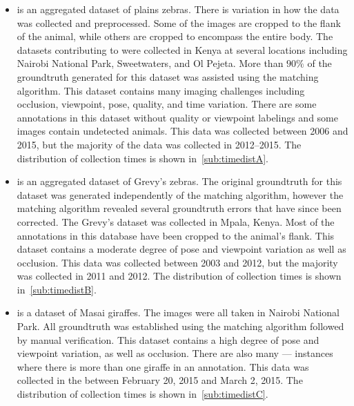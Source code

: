         \begin{itemize}
            \item \textbf{\pzmasterI{}} is an aggregated dataset of
              plains zebras.
            There is variation in how the data was collected and
              preprocessed.
            Some of the images are cropped to the flank of the animal,
              while others are cropped to encompass the entire body.
            The datasets contributing to \pzmasterI{} were collected in
              Kenya at several locations including Nairobi National Park,
              Sweetwaters, and Ol Pejeta.
            More than $90\percent$ of the groundtruth generated for
              this dataset was assisted using the matching algorithm.
            This dataset contains many imaging challenges including
              occlusion, viewpoint, pose, quality, and time variation.
            There are some annotations in this dataset without quality
              or viewpoint labelings and some images contain undetected
              animals.
            This data was collected between 2006 and 2015, but the
              majority of the data was collected in 2012--2015.
            The distribution of collection times is shown
              in~\cref{sub:timedistA}.

            \item \textbf{\gzall{}} is an aggregated dataset of Grevy's
              zebras.
            The original groundtruth for this dataset was generated
              independently of the matching algorithm, however the
              matching algorithm revealed several groundtruth errors that
              have since been corrected.
            The Grevy's dataset was collected in Mpala, Kenya.
            Most of the annotations in this database have been cropped
              to the animal's flank.
            This dataset contains a moderate degree of pose and
              viewpoint variation as well as occlusion.
            This data was collected between 2003 and 2012, but the
              majority was collected in 2011 and 2012.
            The distribution of collection times is shown
              in~\cref{sub:timedistB}.

            \item \textbf{\girmmasterI{}} is a dataset of Masai giraffes.
            The images were all taken in Nairobi National Park.
            All groundtruth was established using the matching
              algorithm followed by manual verification.
            This dataset contains a high degree of pose and viewpoint
              variation, as well as occlusion.
            There are also many  --- instances
              where there is more than one giraffe in an annotation.
            This data was collected in the \GZC{} between February 20,
              2015 and March 2, 2015.
            The distribution of collection times is shown
              in~\cref{sub:timedistC}.
        \end{itemize}

